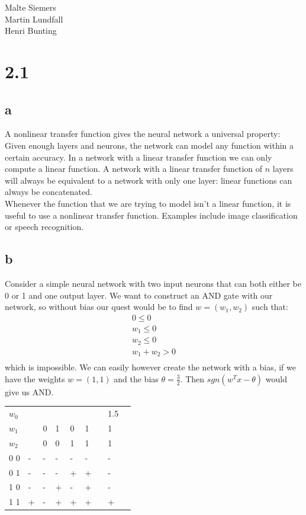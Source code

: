 \documentclass[11pt,a4paper]{article}
\begin{document}
\noindent
Malte Siemers\\
Martin Lundfall\\
Henri Bunting\\
\section*{2.1}
\subsection*{a}
A nonlinear transfer function gives the neural network a universal property: Given enough layers and neurons, the network can model any function within a certain accuracy. In a network with a linear transfer function we can only compute a linear function. A network with a linear transfer function of $n$ layers will always be equivalent to a network with only one layer: linear functions can always be concatenated.\\
Whenever the function that we are trying to model isn't a linear function, it is useful to use a nonlinear transfer function.
Examples include image classification or speech recognition.
\subsection*{b}
Consider a simple neural network with two input neurons that can both either be 0 or 1 and one output layer. We want to construct an AND gate with our network, so without bias our quest would be to find $w = (w_1, w_2)$ such that:
\begin{align*}
  0 \leq 0\\
  w_1 \leq 0\\
  w_2 \leq 0\\
  w_1 + w_2 > 0\\
\end{align*}
which is impossible. We can easily however create the network with a bias, if we have the weights $w = (1, 1)$ and the bias
$\theta = \frac{3}{2}$. Then $sgn(w^Tx - \theta)$ would give us AND.\\
\begin{tabular}{ l | l | l | l | l | l | l | l | l }
$w_0 $ & &   &   &   &   &  & 1.5 \\
$w_1 $ & & 0 & 1 & 0 & 1 &  & 1  \\
$w_2 $ & & 0 & 0 & 1 & 1 &  & 1  \\ \hline
0 0  & - & - & - & - & - &  & -  \\
0 1  & - & - & - & + & + &  & -  \\
1 0  & - & - & + & - & + &  & -  \\
1 1  & + & - & + & + & + &  & +\\ \hline
\end{tabular} \\
\end{document}
